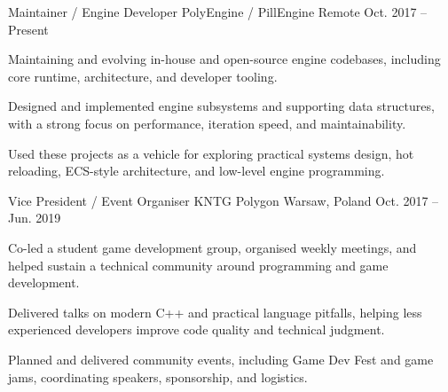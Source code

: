 
\begin{cventries}

  \cventry
    {Maintainer / Engine Developer}
    {PolyEngine / PillEngine}
    {Remote}
    {Oct. 2017 -- Present}
    {
      \begin{cvitems}
        \item {Maintaining and evolving in-house and open-source engine codebases, including core runtime, architecture, and developer tooling.}
        \item {Designed and implemented engine subsystems and supporting data structures, with a strong focus on performance, iteration speed, and maintainability.}
        \item {Used these projects as a vehicle for exploring practical systems design, hot reloading, ECS-style architecture, and low-level engine programming.}
      \end{cvitems}
    }

  \cventry
    {Vice President / Event Organiser}
    {KNTG Polygon}
    {Warsaw, Poland}
    {Oct. 2017 -- Jun. 2019}
    {
      \begin{cvitems}
        \item {Co-led a student game development group, organised weekly meetings, and helped sustain a technical community around programming and game development.}
        \item {Delivered talks on modern C++ and practical language pitfalls, helping less experienced developers improve code quality and technical judgment.}
        \item {Planned and delivered community events, including Game Dev Fest and game jams, coordinating speakers, sponsorship, and logistics.}
      \end{cvitems}
    }

\end{cventries}
